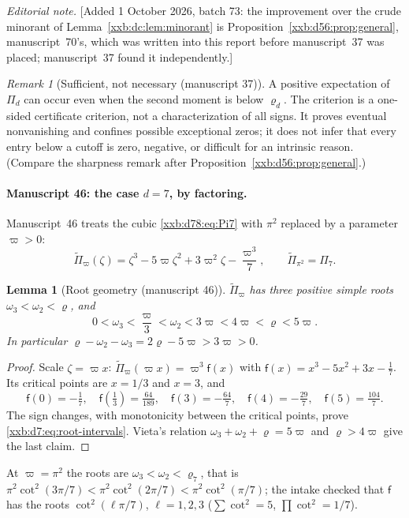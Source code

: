 \documentclass[11pt,a4paper]{article}
\numberwithin{equation}{section}
\newtheorem{lemma}[theorem]{Lemma}
\theoremstyle{definition}
\theoremstyle{remark}
\newtheorem{remark}[theorem]{Remark}
\theoremstyle{plain}
\begin{document}
\emph{Editorial note.}  [Added 1 October 2026, batch 73: the improvement over
the crude minorant of Lemma~\ref{xxb:dc:lem:minorant} is
Proposition~\ref{xxb:d56:prop:general}, manuscript~70's, which was written into
this report before manuscript~37 was placed; manuscript~37 found it
independently.]

\begin{remark}[Sufficient, not necessary (manuscript 37)]\label{xxb:d78:rem:sufficient}
A positive expectation of $\Pi_d$ can occur even when the second moment is
below $\varrho_d$. The criterion is a one-sided certificate criterion, not a
characterization of all signs. It proves eventual nonvanishing and confines
possible exceptional zeros; it does not infer that every entry below a
cutoff is zero, negative, or difficult for an intrinsic reason.
(Compare the sharpness remark after Proposition~\ref{xxb:d56:prop:general}.)
\end{remark}

\paragraph{Manuscript 46: the case $d=7$, by factoring.}
Manuscript~46 treats the cubic \eqref{xxb:d78:eq:Pi7} with $\pi^2$ replaced by
a parameter $\varpi>0$:
\begin{equation}\label{xxb:d7:eq:Pp}
 \widetilde\Pi_\varpi(\zeta)=\zeta^3-5\varpi\zeta^2+3\varpi^2\zeta-\frac{\varpi^3}{7},
 \qquad \widetilde\Pi_{\pi^2}=\Pi_7.
\end{equation}

\begin{lemma}[Root geometry (manuscript 46)]\label{xxb:d7:lem:roots}
$\widetilde\Pi_\varpi$ has three positive simple roots
$\omega_3<\omega_2<\varrho$, and
\begin{equation}\label{xxb:d7:eq:root-intervals}
 0<\omega_3<\frac\varpi3<\omega_2<3\varpi<4\varpi<\varrho<5\varpi.
\end{equation}
In particular $\varrho-\omega_2-\omega_3=2\varrho-5\varpi>3\varpi>0$.
\end{lemma}
\begin{proof}
Scale $\zeta=\varpi x$: $\widetilde\Pi_\varpi(\varpi x)=\varpi^3\mathsf f(x)$
with $\mathsf f(x)=x^3-5x^2+3x-\frac17$.  Its critical points are $x=1/3$ and
$x=3$, and
\[
 \mathsf f(0)=-\tfrac17,\quad \mathsf f(\tfrac13)=\tfrac{64}{189},\quad
 \mathsf f(3)=-\tfrac{64}7,\quad \mathsf f(4)=-\tfrac{29}7,\quad
 \mathsf f(5)=\tfrac{104}7.
\]
The sign changes, with monotonicity between the critical points, prove
\eqref{xxb:d7:eq:root-intervals}.  Vieta's relation
$\omega_3+\omega_2+\varrho=5\varpi$ and $\varrho>4\varpi$ give the last
claim.
\end{proof}
At $\varpi=\pi^2$ the roots are $\omega_3<\omega_2<\varrho_7$, that is
$\pi^2\cot^2(3\pi/7)<\pi^2\cot^2(2\pi/7)<\pi^2\cot^2(\pi/7)$; the intake
checked that $\mathsf f$ has the roots $\cot^2(\ell\pi/7)$, $\ell=1,2,3$
($\sum\cot^2=5$, $\prod\cot^2=1/7$).
\end{document}
